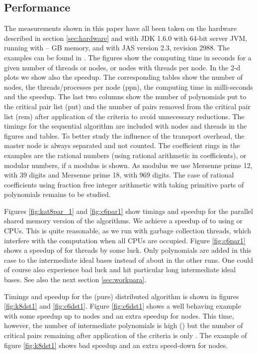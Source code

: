 \documentclass[10pt,twocolumn,a4paper]{article}
\begin{document}
\subsection{Performance} \label{:sec:perf}

The measurements shown in this paper have all been taken on the
hardware described in section \ref{sec:hardware} and with JDK 1.6.0
with 64-bit server JVM, running with  --  GB memory, and with
JAS version 2.3, revision 2988.  The examples can be found in
\cite{Graebe:2006}.  The figures show the computing time in seconds
for a given number of threads or nodes, or nodes with threads per node.
In the 2-d plots we show also the speedup.  The corresponding tables
show the number of nodes, the threads/processes per node (ppn), the
computing time in milli-seconds and the speedup. The last two columns
show the number of polynomials put to the critical pair list (put) and
the number of pairs removed from the critical pair list (rem) after
application of the criteria to avoid unnecessary reductions.  The
timings for the sequential algorithm are included with  nodes and
 threads in the figures and tables. To better study the influence
of the transport overhead, the master node is always separated and not
counted.
The coefficient rings in the examples are the rational numbers (using
rational arithmetic in coefficients), or modular numbers, if a modulus
is shown.  As modulus we use Mersenne prime 12,  with 39
digits and Mersenne prime 18,  with 969 digits.  The case
of rational coefficients using fraction free integer arithmetic with
taking primitive parts of polynomials remains to be studied.

Figures \ref{fig:kat8par_1} and \ref{fig:c6par1} show timings and
speedup for the parallel shared memory version of the algorithms.  We
achieve a speedup of  to  using  or  CPUs. This is quite
reasonable, as we run with  garbage collection threads, which
interfere with the computation when all CPUs are occupied.  Figure
\ref{fig:c6par1} shows a speedup of  for  threads by some luck.
Only  polynomials are added in this case to the intermediate ideal
bases instead of about  in the other runs. One could of course also
experience bad luck and hit particular long intermediate ideal bases.
See also the next section \ref{sec:workpara}.


Timings and speedup for the (pure) distributed algorithm is shown in
figures \ref{fig:k8dst1} and \ref{fig:c6dst1}. Figure \ref{fig:c6dst1} shows a well behaving example with some
speedup up to  nodes and an extra speedup for  nodes. This time,
however, the number of intermediate polynomials is high () but the
number of critical pairs remaining after application of the criteria
is only . The example of figure \ref{fig:k8dst1} shows bad speedup
and an extra speed-down for  nodes.
\end{document}
